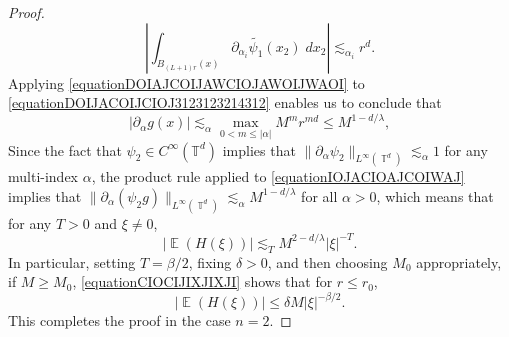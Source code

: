 \documentclass[dvipsnames,letterpaper,12pt]{article}
\numberwithin{equation}{section}
\DeclareMathOperator{\TT}{\mathbb{T}}
\numberwithin{theorem}{section}
\DeclareMathOperator{\EE}{\mathbb{E}}
\begin{document}
\begin{proof}
    \begin{equation} \label{equationDOIAJCOIJAWCIOJAWOIJWAOI}
        \left| \int_{B_{(L+1)r}(x)} \partial_{\alpha_i} \tilde{\psi_1}(x_2)\; dx_2 \right| \lesssim_{\alpha_i} r^d.
    \end{equation}
    Applying \eqref{equationDOIAJCOIJAWCIOJAWOIJWAOI} to \eqref{equationDOIJACOIJCIOJ3123123214312} enables us to conclude that
    \begin{equation} \label{equationIOJACIOAJCOIWAJ}
        |\partial_\alpha g(x)| \lesssim_\alpha \max_{0 < m \leq |\alpha|} M^m r^{md} \leq M^{1 - d/\lambda},
    \end{equation}
    Since the fact that $\psi_2 \in C^\infty(\mathbb{T}^d)$ implies that $\| \partial_\alpha \psi_2 \|_{L^\infty(\TT^d)} \lesssim_\alpha 1$ for any multi-index $\alpha$, the product rule applied to \eqref{equationIOJACIOAJCOIWAJ} implies that $\| \partial_\alpha (\psi_2 g) \|_{L^\infty(\TT^d)} \lesssim_\alpha M^{1 - d/\lambda}$ for all $\alpha > 0$, which means that for any $T > 0$ and $\xi \neq 0$,
    \begin{equation} \label{equationCIOCIJIXJIXJI}
        |\EE(H(\xi))| \lesssim_T M^{2 - d/\lambda} |\xi|^{-T}.
    \end{equation}
    In particular, setting $T = \beta/2$, fixing $\delta > 0$, and then choosing $M_0$ appropriately, if $M \geq M_0$, \eqref{equationCIOCIJIXJIXJI} shows that for $r \leq r_0$,
    \begin{equation}
        |\EE(H(\xi))| \leq \delta M |\xi|^{-\beta/2}.
    \end{equation}
    This completes the proof in the case $n = 2$.


\end{proof}
\end{document}
